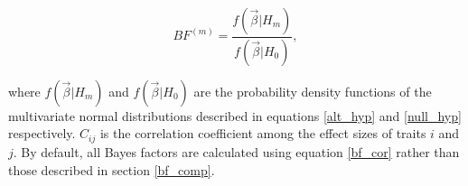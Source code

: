 \documentclass{article}
\begin{document}
\begin{equation}
\label{bf_cor}
BF^{(m)} = \frac{f(\vec{\beta}| H_m)}{f(\vec{\beta}| H_0)},
\end{equation}

\noindent where $f(\vec{\beta}| H_m)$ and $f(\vec{\beta}| H_0)$ are the probability density functions of the multivariate normal distributions described in equations \ref{alt_hyp} and \ref{null_hyp} respectively. $C_{ij}$ is the correlation coefficient among the effect sizes of traits $i$ and $j$. By default, all Bayes factors are calculated using equation \ref{bf_cor} rather than those described in section \ref{bf_comp}.




\end{document}
